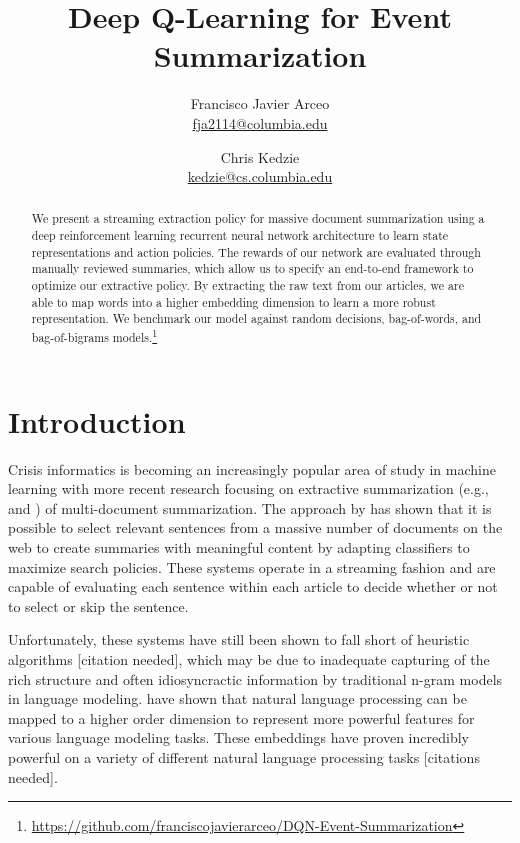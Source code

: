 \documentclass[12pt]{article}
\title{Deep Q-Learning for Event Summarization }
\author{
	Francisco Javier Arceo \\ \href{mailto: fja2114@columbia.edu}{\small fja2114@columbia.edu} 
		\and  
	Chris Kedzie \\ \href{mailto: kedzie@cs.columbia.edu}{\small kedzie@cs.columbia.edu} 
	}
\begin{document}
\maketitle

\begin{abstract}
We present a streaming extraction policy for massive document summarization using a deep reinforcement learning recurrent neural network architecture to learn state representations and action policies. The rewards of our network are evaluated through manually reviewed summaries, which allow us to specify an end-to-end framework to optimize our extractive policy.  By extracting the raw text from our articles, we are able to map words into a higher embedding dimension to learn a more robust representation. We benchmark our model against random decisions, bag-of-words, and bag-of-bigrams models.\footnote{ \url{https://github.com/franciscojavierarceo/DQN-Event-Summarization} }
\end{abstract}




\section{Introduction}

Crisis informatics is becoming an increasingly popular area of study in machine learning with more recent research focusing on extractive summarization (e.g., \cite{kedzie2015predicting} and \cite{kedzieextractive}) of multi-document summarization. The approach by \cite{kedzie2015predicting}  has shown that it is possible to select relevant sentences from a massive number of documents on the web to create summaries with meaningful content by adapting classifiers to maximize search policies. These systems operate in a streaming fashion and are capable of evaluating each sentence within each article to decide whether or not to select or skip the sentence. 

Unfortunately, these systems have still been shown to fall short of heuristic algorithms [citation needed], which may be due to inadequate capturing of the rich structure and often idiosyncractic information by traditional n-gram models  in language modeling. \cite{bengio2003neural} have shown that natural language processing can be mapped to a higher order dimension to represent more powerful features for various language modeling tasks. These embeddings have proven incredibly powerful on a variety of different natural language processing tasks [citations needed].
\end{document}
